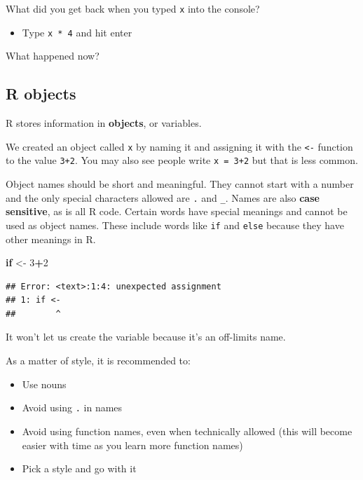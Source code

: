 \documentclass[]{book}
\newenvironment{Shaded}{\begin{snugshade}}{\end{snugshade}}
\newcommand{\DecValTok}[1]{\textcolor[rgb]{0.00,0.00,0.81}{#1}}
\newcommand{\StringTok}[1]{\textcolor[rgb]{0.31,0.60,0.02}{#1}}
\newcommand{\ControlFlowTok}[1]{\textcolor[rgb]{0.13,0.29,0.53}{\textbf{#1}}}
\newcommand{\OperatorTok}[1]{\textcolor[rgb]{0.81,0.36,0.00}{\textbf{#1}}}
\newcommand{\NormalTok}[1]{#1}
\providecommand{\tightlist}{%
  \setlength{\itemsep}{0pt}\setlength{\parskip}{0pt}}
\begin{document}
What did you get back when you typed \texttt{x} into the console?

\begin{itemize}
\tightlist
\item
  Type \texttt{x\ *\ 4} and hit enter
\end{itemize}

What happened now?

\subsection{R objects}\label{r-objects}

R stores information in \textbf{objects}, or variables.

We created an object called \texttt{x} by naming it and assigning it
with the \texttt{\textless{}-} function to the value \texttt{3+2}. You
may also see people write \texttt{x\ =\ 3+2} but that is less common.

Object names should be short and meaningful. They cannot start with a
number and the only special characters allowed are \texttt{.} and
\texttt{\_}. Names are also \textbf{case sensitive}, as is all R code.
Certain words have special meanings and cannot be used as object names.
These include words like \texttt{if} and \texttt{else} because they have
other meanings in R.

\begin{Shaded}
\begin{Highlighting}[]
\ControlFlowTok{if}\NormalTok{ <-}\StringTok{ }\DecValTok{3}\OperatorTok{+}\DecValTok{2}
\end{Highlighting}
\end{Shaded}

\begin{verbatim}
## Error: <text>:1:4: unexpected assignment
## 1: if <-
##        ^
\end{verbatim}

It won't let us create the variable because it's an off-limits name.

As a matter of style, it is recommended to:

\begin{itemize}
\item
  Use nouns
\item
  Avoid using \texttt{.} in names
\item
  Avoid using function names, even when technically allowed (this will
  become easier with time as you learn more function names)
\item
  Pick a style and go with it
\end{itemize}
\end{document}

